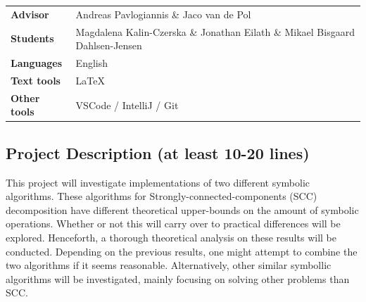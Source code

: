 \documentclass{article}
\begin{document}
\pagestyle{fancy}

\bgroup{}
\begin{table}[h]
\begin{tabular}{ll}
\textbf{Advisor}     & Andreas Pavlogiannis \& Jaco van de Pol               \\
\textbf{Students}    & Magdalena Kalin-Czerska \& Jonathan Eilath \& Mikael Bisgaard Dahlsen-Jensen   \\
\textbf{Languages}   & English \\
\textbf{Text tools}  & \LaTeX       \\
\textbf{Other tools} & VSCode / IntelliJ  / Git       
\end{tabular}
\end{table}
\egroup\vspace{-0.cm}

\subsection*{Project Description (at least 10-20 lines)}

This project will investigate implementations of two different symbolic algorithms. These algorithms for Strongly-connected-components (SCC) decomposition have different theoretical upper-bounds on the amount of symbolic operations. Whether or not this will carry over to practical differences will be explored. Henceforth, a thorough theoretical analysis on these results will be conducted. Depending on the previous results, one might attempt to combine the two algorithms if it seems reasonable. Alternatively, other similar symbollic algorithms will be investigated, mainly focusing on solving other problems than SCC. \\[2mm]
\end{document}

